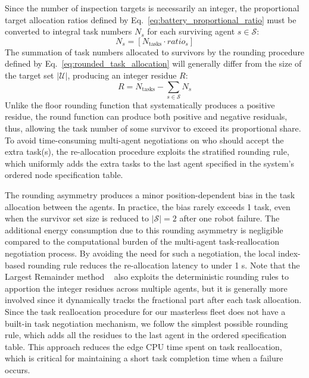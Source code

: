 Since the number of inspection targets is necessarily an integer, the proportional target allocation ratios defined by Eq.~\ref{eq:battery_proportional_ratio} must be converted to integral task numbers $N_s$ for each surviving agent $s \in \mathcal{S}$:
\begin{equation} N_s = \left[ N_{\text{tasks}} \cdot ratio_s \right] \label{eq:rounded_task_allocation} \end{equation}
The summation of task numbers allocated to survivors by the rounding procedure defined by Eq.~\ref{eq:rounded_task_allocation} will generally differ from the size of the target set $\lvert\mathcal{U}\rvert$, producing an integer residue $R$:
\begin{equation} R = N_{\text{tasks}} - \sum_{s \in \mathcal{S}} N_s \label{eq:rounding_residual} \end{equation}
Unlike the floor rounding function that systematically produces a positive residue, the round function can produce both positive and negative residuals, thus, allowing the task number of some survivor to exceed its proportional share. To avoid time-consuming multi-agent negotiations on who should accept the extra task(s), the re-allocation procedure exploits the stratified rounding rule, which uniformly adds the extra tasks to the last agent specified in the system's ordered node specification table.

The rounding asymmetry produces a minor position-dependent bias in the task allocation between the agents. In practice, the bias rarely exceeds 1 task, even when the survivor set size is reduced to $\lvert\mathcal{S}\rvert = 2$ after one robot failure. The additional energy consumption due to this rounding asymmetry is negligible compared to the computational burden of the multi-agent task-reallocation negotiation process. By avoiding the need for such a negotiation, the local index-based rounding rule reduces the re-allocation latency to under 1 s. Note that the Largest Remainder method ~\cite{brill2018multiwinner} also exploits the deterministic rounding rules to apportion the integer residues across multiple agents, but it is generally more involved since it dynamically tracks the fractional part after each task allocation. Since the task reallocation procedure for our masterless fleet does not have a built-in task negotiation mechanism, we follow the simplest possible rounding rule, which adds all the residues to the last agent in the ordered specification table. This approach reduces the edge CPU time spent on task reallocation, which is critical for maintaining a short task completion time when a failure occurs.


